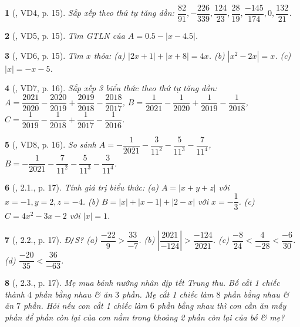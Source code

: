 \documentclass{article}
\newtheorem{baitoan}{}
\begin{document}
\begin{baitoan}[\cite{Binh_boi_duong_Toan_7_tap_1}, VD4, p. 15]
	Sắp xếp theo thứ tự tăng dần: $\dfrac{82}{91},-\dfrac{226}{339},\dfrac{124}{23},\dfrac{28}{19},\dfrac{-145}{174},0,\dfrac{132}{21}$.
\end{baitoan}

\begin{baitoan}[\cite{Binh_boi_duong_Toan_7_tap_1}, VD5, p. 15]
	Tìm {\rm GTLN} của $A = 0.5 - |x - 4.5|$.
\end{baitoan}

\begin{baitoan}[\cite{Binh_boi_duong_Toan_7_tap_1}, VD6, p. 15]
	Tìm $x$ thỏa: (a) $|2x + 1| + |x + 8| = 4x$. (b) $|x^2 - 2x| = x$. (c) $|x| = -x - 5$.
\end{baitoan}

\begin{baitoan}[\cite{Binh_boi_duong_Toan_7_tap_1}, VD7, p. 16]
	Sắp xếp 3 biểu thức theo thứ tự tăng dần: $A = \dfrac{2021}{2020} - \dfrac{2020}{2019} + \dfrac{2019}{2018} - \dfrac{2018}{2017}$, $B = \dfrac{1}{2021} - \dfrac{1}{2020} + \dfrac{1}{2019} - \dfrac{1}{2018}$, $C = \dfrac{1}{2019} - \dfrac{1}{2018} + \dfrac{1}{2017} - \dfrac{1}{2016}$.
\end{baitoan}

\begin{baitoan}[\cite{Binh_boi_duong_Toan_7_tap_1}, VD8, p. 16]
	So sánh $A = -\dfrac{1}{2021} - \dfrac{3}{11^2} - \dfrac{5}{11^3} - \dfrac{7}{11^4}$, $B = -\dfrac{1}{2021} - \dfrac{7}{11^2} - \dfrac{5}{11^3} - \dfrac{3}{11^4}$.
\end{baitoan}

\begin{baitoan}[\cite{Binh_boi_duong_Toan_7_tap_1}, 2.1., p. 17]
	Tính giá trị biểu thức: (a) $A = |x + y + z|$ với $x = -1,y = 2,z = -4$. (b) $B = |x| + |x - 1| + |2 - x|$ với $x = -\dfrac{1}{3}$. (c) $C = 4x^2 - 3x - 2$ với $|x| = 1$.
\end{baitoan}

\begin{baitoan}[\cite{Binh_boi_duong_Toan_7_tap_1}, 2.2., p. 17]
	{\rm Đ{\tt/}S?} (a) $\dfrac{-22}{9} > \dfrac{33}{-7}$. (b) $\left|\dfrac{2021}{-124}\right| > \dfrac{-124}{2021}$. (c) $\dfrac{-8}{24} < \dfrac{4}{-28} < \dfrac{-6}{30}$. (d) $\dfrac{-20}{35} < \dfrac{36}{-63}$.
\end{baitoan}

\begin{baitoan}[\cite{Binh_boi_duong_Toan_7_tap_1}, 2.3., p. 17]
	Mẹ mua bánh nướng nhân dịp tết Trung thu. Bố cắt 1 chiếc thành $4$ phần bằng nhau \& ăn $3$ phần. Mẹ cắt 1 chiếc làm $8$ phần bằng nhau \& ăn $7$ phần. Hỏi nếu con cắt 1 chiếc làm $6$ phần bằng nhau thì con cần ăn mấy phần để phần còn lại của con nằm trong khoảng 2 phần còn lại của bố \& mẹ?
\end{baitoan}
\end{document}
